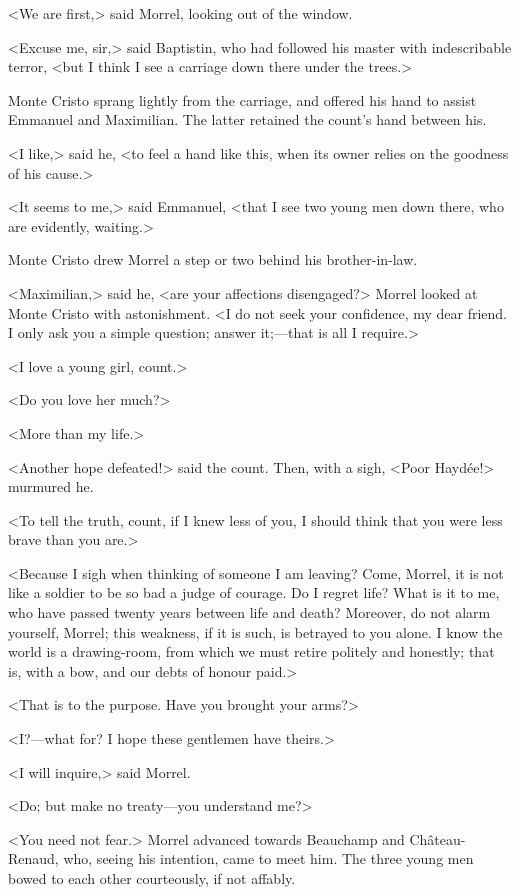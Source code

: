  <We are first,> said Morrel, looking out of the window. 

 <Excuse me, sir,> said Baptistin, who had followed his master with indescribable terror, <but I think I see a carriage down there under the trees.> 

 Monte Cristo sprang lightly from the carriage, and offered his hand to assist Emmanuel and Maximilian. The latter retained the count's hand between his. 

 <I like,> said he, <to feel a hand like this, when its owner relies on the goodness of his cause.> 

 <It seems to me,> said Emmanuel, <that I see two young men down there, who are evidently, waiting.> 

 Monte Cristo drew Morrel a step or two behind his brother-in-law. 

 <Maximilian,> said he, <are your affections disengaged?> Morrel looked at Monte Cristo with astonishment. <I do not seek your confidence, my dear friend. I only ask you a simple question; answer it;—that is all I require.> 

 <I love a young girl, count.> 

 <Do you love her much?> 

 <More than my life.> 

 <Another hope defeated!> said the count. Then, with a sigh, <Poor Haydée!> murmured he. 

 <To tell the truth, count, if I knew less of you, I should think that you were less brave than you are.> 

 <Because I sigh when thinking of someone I am leaving? Come, Morrel, it is not like a soldier to be so bad a judge of courage. Do I regret life? What is it to me, who have passed twenty years between life and death? Moreover, do not alarm yourself, Morrel; this weakness, if it is such, is betrayed to you alone. I know the world is a drawing-room, from which we must retire politely and honestly; that is, with a bow, and our debts of honour paid.> 

 <That is to the purpose. Have you brought your arms?> 

 <I?—what for? I hope these gentlemen have theirs.> 

 <I will inquire,> said Morrel. 

 <Do; but make no treaty—you understand me?> 

 <You need not fear.> Morrel advanced towards Beauchamp and Château-Renaud, who, seeing his intention, came to meet him. The three young men bowed to each other courteously, if not affably. 

